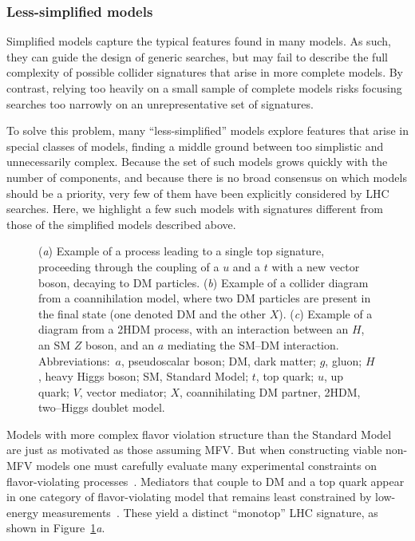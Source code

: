 \documentclass{ar-1col}
\begin{document}
{\subsubsection{Less-simplified models}\label{sec:LessSimplifiedModels}

Simplified models capture the typical features found in many models. 
As such, they can guide the design of generic searches, but may fail to describe
the full complexity of possible collider signatures that
arise in more complete models. By contrast, 
relying too heavily on a small sample of complete models risks focusing
searches too narrowly on an unrepresentative set of signatures.

To solve this problem, 
many ``less-simplified'' models explore features that arise in special classes of models, 
finding a middle ground between too
simplistic and unnecessarily complex. Because the
set of such models grows quickly with the number of components,
and because there is no broad consensus on which models should be a
priority, very few of them have been explicitly considered by LHC
searches. Here, we highlight a few such models with signatures different from those of
 the simplified models described above.

\begin{figure}[!htpb]
\caption{
(\textit{a}) Example of a process leading to a single top signature, proceeding through the coupling of a $u$ and a  $t$ with a new vector boson, decaying to DM particles. 
(\textit{b}) Example of a collider diagram from a coannihilation model, where two DM particles are present in the final state (one denoted DM and the other  $X$). 
(\textit{c}) Example of a diagram from a 2HDM process, with an interaction between an  $H$, an SM $Z$ boson, and an $a$ mediating the SM--DM interaction. 
Abbreviations:\ $a$, pseudoscalar boson; DM, dark matter; $g$, gluon; $H$, heavy Higgs boson; SM, Standard Model; $t$, top quark;  $u$, up quark; $V$, vector mediator; $X$, coannihilating DM partner, 2HDM, two--Higgs doublet model.}
\label{fig:feynman_2}
\end{figure}

Models with more complex flavor violation structure than the Standard Model 
are just as motivated as those assuming MFV. 
But when constructing viable non-MFV models one must carefully evaluate 
many experimental constraints on flavor-violating processes~\cite{Blanke:2017tnb}. 
Mediators that couple to
DM and a top quark appear in one category of flavor-violating
model that remains least constrained by low-energy
measurements~\cite{Boucheneb:2014wza}. These yield a distinct
``monotop'' LHC signature, as shown in Figure~\ref{fig:feynman_2}\textit{a}.

}
\end{document}
